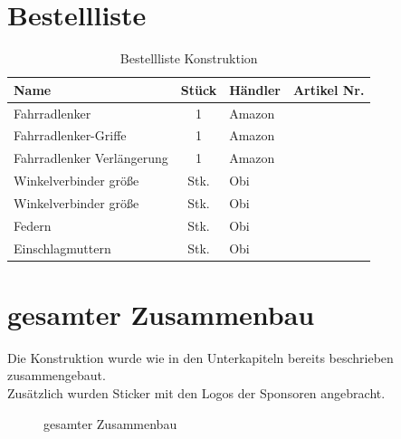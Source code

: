 \section{Bestellliste}
\begin{table}[h]
    \centering
    \begin{threeparttable}
    \begin{tabular}{|l|c|M{3cm}|l|}
        \hline
    Name & Stück & Händler & Artikel Nr. \\\hline
    Fahrradlenker & 1 & Amazon & \\
    Fahrradlenker-Griffe & 1 & Amazon & \\
    Fahrradlenker Verlängerung & 1 & Amazon & \\\hline
    Winkelverbinder größe& Stk. & Obi & \\
    Winkelverbinder größe& Stk. & Obi & \\
    Federn& Stk. & Obi & \\
    Einschlagmuttern& Stk. & Obi & \\\hline
    
    \end{tabular}
\end{threeparttable}
    \caption{Bestellliste Konstruktion}
\end{table}

\clearpage
\section{gesamter Zusammenbau}
Die Konstruktion wurde wie in den Unterkapiteln bereits beschrieben zusammengebaut.\\
Zusätzlich wurden Sticker mit den Logos der Sponsoren angebracht.
\begin{figure}[H]
    \centering
    \caption{gesamter Zusammenbau}
\end{figure}

